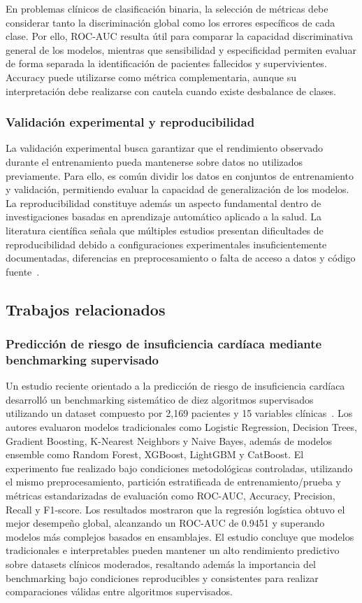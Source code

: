 En problemas clínicos de clasificación binaria, la selección de métricas debe
considerar tanto la discriminación global como los errores específicos de cada
clase. Por ello, ROC-AUC resulta útil para comparar la capacidad discriminativa
general de los modelos, mientras que sensibilidad y especificidad permiten
evaluar de forma separada la identificación de pacientes fallecidos y
supervivientes. Accuracy puede utilizarse como métrica complementaria, aunque su
interpretación debe realizarse con cautela cuando existe desbalance de clases.

\subsubsection{Validación experimental y reproducibilidad}

La validación experimental busca garantizar que el rendimiento observado durante el entrenamiento pueda mantenerse sobre datos no utilizados previamente. Para ello, es común dividir los datos en conjuntos de entrenamiento y validación, permitiendo evaluar la capacidad de generalización de los modelos.
La reproducibilidad constituye además un aspecto fundamental dentro de investigaciones basadas en aprendizaje automático aplicado a la salud. La literatura científica señala que múltiples estudios presentan dificultades de reproducibilidad debido a configuraciones experimentales insuficientemente documentadas, diferencias en preprocesamiento o falta de acceso a datos y código fuente~\citep{moassefi2023}.

\subsection{Trabajos relacionados}

\subsubsection{Predicción de riesgo de insuficiencia cardíaca mediante benchmarking supervisado}

Un estudio reciente orientado a la predicción de riesgo de insuficiencia cardíaca desarrolló un benchmarking sistemático de diez algoritmos supervisados utilizando un dataset compuesto por 2,169 pacientes y 15 variables clínicas~\citep{li2026}. Los autores evaluaron modelos tradicionales como Logistic Regression, Decision Trees, Gradient Boosting, K-Nearest Neighbors y Naive Bayes, además de modelos ensemble como Random Forest, XGBoost, LightGBM y CatBoost.
El experimento fue realizado bajo condiciones metodológicas controladas, utilizando el mismo preprocesamiento, partición estratificada de entrenamiento/prueba y métricas estandarizadas de evaluación como ROC-AUC, Accuracy, Precision, Recall y F1-score. Los resultados mostraron que la regresión logística obtuvo el mejor desempeño global, alcanzando un ROC-AUC de 0.9451 y superando modelos más complejos basados en ensamblajes.
El estudio concluye que modelos tradicionales e interpretables pueden mantener un alto rendimiento predictivo sobre datasets clínicos moderados, resaltando además la importancia del benchmarking bajo condiciones reproducibles y consistentes para realizar comparaciones válidas entre algoritmos supervisados.

